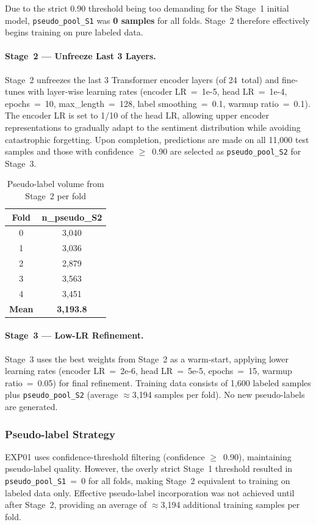\documentclass[10pt,twocolumn]{article}
\begin{document}
Due to the strict 0.90 threshold being too demanding for the Stage~1
initial model, \texttt{pseudo\_pool\_S1} was \textbf{0 samples} for all
folds. Stage~2 therefore effectively begins training on pure labeled
data.

\paragraph{Stage~2 --- Unfreeze Last 3 Layers.}
Stage~2 unfreezes the last 3 Transformer encoder layers (of 24~total)
and fine-tunes with layer-wise learning rates (encoder LR~=~1e-5, head
LR~=~1e-4, epochs~=~10, max\_length~=~128, label smoothing~=~0.1,
warmup ratio~=~0.1). The encoder LR is set to 1/10 of the head LR,
allowing upper encoder representations to gradually adapt to the
sentiment distribution while avoiding catastrophic forgetting. Upon
completion, predictions are made on all 11,000 test samples and those
with confidence $\geq$~0.90 are selected as \texttt{pseudo\_pool\_S2}
for Stage~3.

\begin{table}[h]
\centering
\caption{Pseudo-label volume from Stage~2 per fold}
\label{tab:pseudo_s2}
\begin{tabular}{cc}
\toprule
\textbf{Fold} & \textbf{n\_pseudo\_S2} \\
\midrule
0 & 3,040 \\
1 & 3,036 \\
2 & 2,879 \\
3 & 3,563 \\
4 & 3,451 \\
\midrule
\textbf{Mean} & \textbf{3,193.8} \\
\bottomrule
\end{tabular}
\end{table}

\paragraph{Stage~3 --- Low-LR Refinement.}
Stage~3 uses the best weights from Stage~2 as a warm-start, applying
lower learning rates (encoder LR~=~2e-6, head LR~=~5e-5, epochs~=~15,
warmup ratio~=~0.05) for final refinement. Training data consists of
1,600 labeled samples plus \texttt{pseudo\_pool\_S2} (average
$\approx$3,194 samples per fold). No new pseudo-labels are generated.

\subsubsection{Pseudo-label Strategy}
EXP01 uses confidence-threshold filtering (confidence $\geq$~0.90),
maintaining pseudo-label quality. However, the overly strict Stage~1
threshold resulted in \texttt{pseudo\_pool\_S1}~=~0 for all folds,
making Stage~2 equivalent to training on labeled data only. Effective
pseudo-label incorporation was not achieved until after Stage~2,
providing an average of $\approx$3,194 additional training samples per
fold.
\end{document}
